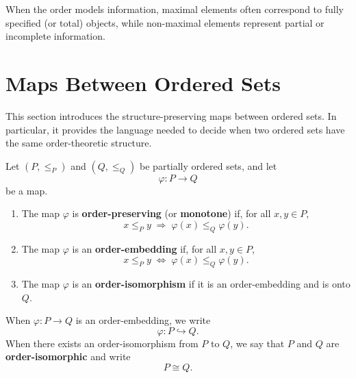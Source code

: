\begin{remark}[Interpretation]
When the order models information, maximal elements often correspond to fully specified (or total) objects, while non-maximal elements represent partial or incomplete information.
\end{remark}


\section{Maps Between Ordered Sets}

This section introduces the structure-preserving maps between ordered sets. In particular, it provides the language needed to decide when two ordered sets have the same order-theoretic structure.


\begin{definition}
Let $(P,\le_P)$ and $(Q,\le_Q)$ be partially ordered sets, and let
\[
\varphi : P \to Q
\]
be a map.

\begin{enumerate}
    \item The map $\varphi$ is \textbf{order-preserving} (or \textbf{monotone}) if, for all $x,y \in P$,
    \[
    x \le_P y \;\Longrightarrow\; \varphi(x) \le_Q \varphi(y).
    \]

    \item The map $\varphi$ is an \textbf{order-embedding} if, for all $x,y \in P$,
    \[
    x \le_P y \;\Longleftrightarrow\; \varphi(x) \le_Q \varphi(y).
    \]

    \item The map $\varphi$ is an \textbf{order-isomorphism} if it is an order-embedding and is onto $Q$.
\end{enumerate}
\end{definition}

\begin{remark}[Notation]
When $\varphi : P \to Q$ is an order-embedding, we write
\[
\varphi : P \hookrightarrow Q.
\]
When there exists an order-isomorphism from $P$ to $Q$, we say that $P$ and $Q$ are \textbf{order-isomorphic} and write
\[
P \cong Q.
\]
\end{remark}

